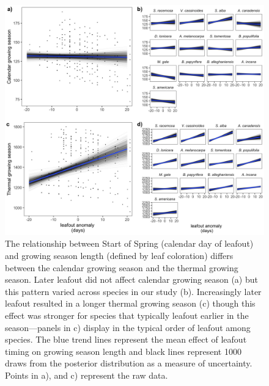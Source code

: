 \documentclass{article}[11pt]
\begin{document}
\begin{figure}[h!]
    \centering
 \includegraphics[width=.8\textwidth]{..//analyses/figures/fullgrowingseason_modplots.jpeg} 
    \caption{The relationship between Start of Spring (calendar day of leafout) and growing season length (defined by leaf coloration) differs between the calendar growing season and the thermal growing season. Later leafout did not affect calendar growing season (a) but this pattern varied  across species in our study (b). Increasingly later leafout resulted in a longer thermal growing season (c) though this effect was stronger for species that typically leafout earlier in the season---panels in c) display in the typical order of leafout among species. The blue trend lines represent the mean effect of leafout timing on growing season length and black lines represent 1000 draws from the posterior distribution as a measure of uncertainty. Points in a), and c) represent the raw data.}
    \label{fig:leafrel}
\end{figure}
\end{document}
